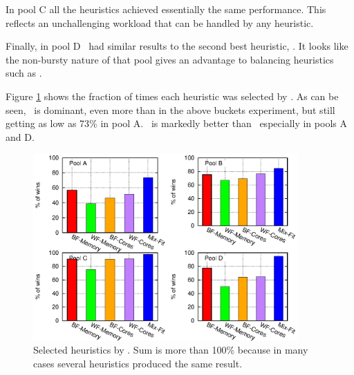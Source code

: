 In pool C all the heuristics achieved essentially the same performance.
This reflects an unchallenging workload that can be handled by any heuristic.

Finally, in pool D \mif\ had similar results to the second best heuristic, \wfc.
It looks like the non-bursty nature of that pool gives an advantage to balancing
heuristics such as \wfc. 


Figure \ref{fig:max-jobs-selected} shows the fraction of
times each heuristic was selected by \maj.
As can be seen, \mif\ is dominant, even more than in the
above buckets experiment, but still getting as low as 73\%
in pool A.
\bfm\ is markedly better than \wfc\ especially in pools A and D.

\begin{figure}\centering
	\includegraphics[width=0.9\textwidth]{figures/max-jobs-selected.eps}
\caption{Selected heuristics by \maj.
Sum is more than 100\% because in many cases several heuristics
produced the same result.}
\label{fig:max-jobs-selected}
\end{figure}


